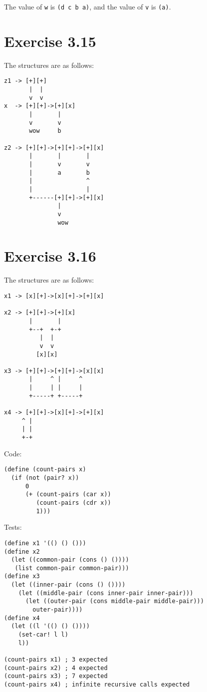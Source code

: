\documentclass[../main.tex]{subfiles}
\begin{document}
The value of \lstinline{w} is \lstinline{(d c b a)},
 and the value of \lstinline{v} is \lstinline{(a)}.

\section{Exercise 3.15}

The structures are as follows:

\begin{lstlisting}
z1 -> [+][+]
       |  |
       v  v
x  -> [+][+]->[+][x]
       |       |
       v       v
       wow     b

z2 -> [+][+]->[+][+]->[+][x]
       |       |       |
       |       v       v
       |       a       b
       |               ^
       |               |
       +------[+][+]->[+][x]
               |
               v
               wow
\end{lstlisting}

\section{Exercise 3.16}

The structures are as follows:

\begin{lstlisting}
x1 -> [x][+]->[x][+]->[+][x]

x2 -> [+][+]->[+][x]
       |       |
       +--+  +-+
          |  |
          v  v
         [x][x]

x3 -> [+][+]->[+][+]->[x][x]
       |     ^ |     ^
       |     | |     |
       +-----+ +-----+

x4 -> [+][+]->[x][+]->[+][x]
     ^ |
     | |
     +-+
\end{lstlisting}

Code:

\begin{lstlisting}
(define (count-pairs x)
  (if (not (pair? x))
      0
      (+ (count-pairs (car x))
         (count-pairs (cdr x))
         1)))
\end{lstlisting}

Tests:

\begin{lstlisting}
(define x1 '(() () ()))
(define x2
  (let ((common-pair (cons () ())))
   (list common-pair common-pair)))
(define x3
  (let ((inner-pair (cons () ())))
    (let ((middle-pair (cons inner-pair inner-pair)))
      (let ((outer-pair (cons middle-pair middle-pair)))
        outer-pair))))
(define x4
  (let ((l '(() () ())))
    (set-car! l l)
    l))

(count-pairs x1) ; 3 expected
(count-pairs x2) ; 4 expected
(count-pairs x3) ; 7 expected
(count-pairs x4) ; infinite recursive calls expected
\end{lstlisting}
\end{document}
